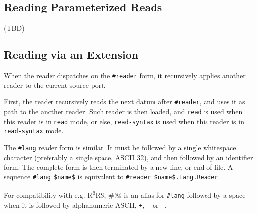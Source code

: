 \subsection{Reading Parameterized Reads}
\label{subsec:aml-base-lang-reader-parameterized-reads}


(TBD)





\subsection{Reading via an Extension}
\label{subsec:aml-base-lang-reader-extension}

When the reader dispatches on the \lstinline!#reader! form, it recursively applies another reader to the current source port. 


First, the reader recursively reads the next datum after \lstinline!#reader!, and uses it as path to the another reader. Such reader is then loaded, and \lstinline!read! is used when this reader is in \lstinline!read! mode, or else, \lstinline!read-syntax! is used when this reader is in \lstinline!read-syntax! mode.

The \lstinline!#lang! reader form is similar. It must be followed by a single whitespace character (preferably a single space, ASCII 32), and then followed by an identifier form. The complete form is then terminated by a new line, or end-of-file. A sequence \lstinline!#lang $name$! is equivalent to \lstinline!#reader $name$.Lang.Reader!. 


For compatibility with e.g. R\textsuperscript{6}RS, \lstinline@#!@ is an alias for \lstinline!#lang! followed by a space when it is followed by alphanumeric ASCII, \lstinline!+!, \lstinline!-! or \lstinline!_!. 





